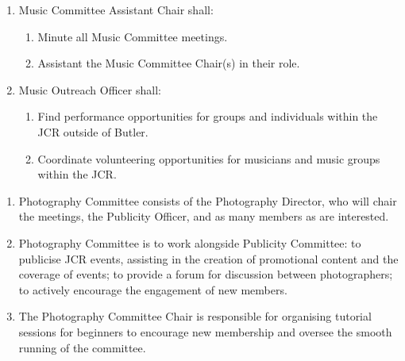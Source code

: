\begin{enumerate}
\begin{enumerate}
\begin{enumerate}
        \end{enumerate}
        \item Music Committee Assistant Chair shall:
        \begin{enumerate}
            \item Minute all Music Committee meetings. 
            \item Assistant the Music Committee Chair(s) in their role.
        \end{enumerate}
        \item Music Outreach Officer shall:
        \begin{enumerate}
            \item  Find performance opportunities for groups and individuals within the JCR outside of Butler.
            \item Coordinate volunteering opportunities for musicians and music groups within the JCR.
        \end{enumerate}
    \end{enumerate}
\end{enumerate}



\begin{enumerate}
    \item Photography Committee consists of the Photography Director, who will chair the meetings, the Publicity Officer, and as many members as are interested.
    \item Photography Committee is to work alongside Publicity Committee: to publicise JCR events, assisting in the creation of promotional content and the coverage of events; to provide a forum for discussion between photographers; to actively encourage the engagement of new members.
    \item The Photography Committee Chair is responsible for organising tutorial sessions for beginners to encourage new membership and oversee the smooth running of the committee.
\end{enumerate}


